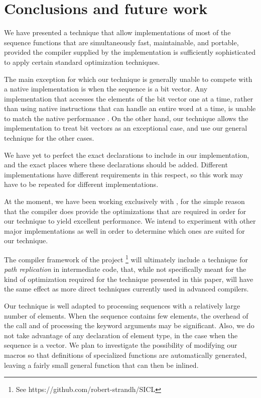 \section{Conclusions and future work}

We have presented a technique that allow implementations of most of
the \commonlisp{} sequence functions that are simultaneously fast,
maintainable, and portable, provided the compiler supplied by the
implementation is sufficiently sophisticated to apply certain standard
optimization techniques.

The main exception for which our technique is generally unable to
compete with a native implementation is when the sequence is a bit
vector.  Any implementation that accesses the elements of the bit
vector one at a time, rather than using native instructions that can
handle an entire word at a time, is unable to match the native
performance \cite{Baker:1990:EIB:121989.121991}.  On the other hand,
our technique allows the \commonlisp{} implementation to treat bit
vectors as an exceptional case, and use our general technique for the
other cases.

We have yet to perfect the exact declarations to include in our
implementation, and the exact places where these declarations should
be added.  Different \commonlisp{} implementations have different
requirements in this respect, so this work may have to be repeated for
different implementations.

At the moment, we have been working exclusively with \sbcl{}, for the
simple reason that the \sbcl{} compiler does provide the optimizations
that are required in order for our technique to yield excellent
performance.  We intend to experiment with other major implementations
as well in order to determine which ones are suited for our
technique.

The \cleavir{} compiler framework of the \sicl{} project%
\footnote{See https://github.com/robert-strandh/SICL} will ultimately
include a technique for \emph{path replication} in intermediate code,
that, while not specifically meant for the kind of optimization
required for the technique presented in this paper, will have the same
effect as more direct techniques currently used in advanced
compilers.

Our technique is well adapted to processing sequences with a
relatively large number of elements.  When the sequence contains few
elements, the overhead of the call and of processing the keyword
arguments may be significant.  Also, we do not take advantage of any
declaration of element type, in the case when the sequence is a
vector.  We plan to investigate the possibility of modifying our
macros so that definitions of specialized functions are automatically
generated, leaving a fairly small general function that can then be
inlined.
